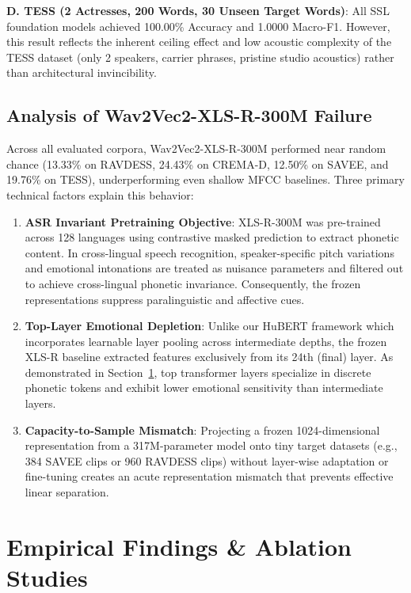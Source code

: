 \documentclass[10pt,journal,compsoc]{IEEEtran}
\begin{document}
\textbf{D. TESS (2 Actresses, 200 Words, 30 Unseen Target Words)}: All SSL foundation models achieved 100.00\% Accuracy and 1.0000 Macro-F1. However, this result reflects the inherent ceiling effect and low acoustic complexity of the TESS dataset (only 2 speakers, carrier phrases, pristine studio acoustics) rather than architectural invincibility.

\subsection{Analysis of Wav2Vec2-XLS-R-300M Failure}
Across all evaluated corpora, Wav2Vec2-XLS-R-300M performed near random chance (13.33\% on RAVDESS, 24.43\% on CREMA-D, 12.50\% on SAVEE, and 19.76\% on TESS), underperforming even shallow MFCC baselines. Three primary technical factors explain this behavior:
\begin{enumerate}
    \item \textbf{ASR Invariant Pretraining Objective}: XLS-R-300M was pre-trained across 128 languages using contrastive masked prediction to extract phonetic content. In cross-lingual speech recognition, speaker-specific pitch variations and emotional intonations are treated as nuisance parameters and filtered out to achieve cross-lingual phonetic invariance. Consequently, the frozen representations suppress paralinguistic and affective cues.
    \item \textbf{Top-Layer Emotional Depletion}: Unlike our HuBERT framework which incorporates learnable layer pooling across intermediate depths, the frozen XLS-R baseline extracted features exclusively from its 24th (final) layer. As demonstrated in Section~\ref{sec:ablation}, top transformer layers specialize in discrete phonetic tokens and exhibit lower emotional sensitivity than intermediate layers.
    \item \textbf{Capacity-to-Sample Mismatch}: Projecting a frozen 1024-dimensional representation from a 317M-parameter model onto tiny target datasets (e.g., 384 SAVEE clips or 960 RAVDESS clips) without layer-wise adaptation or fine-tuning creates an acute representation mismatch that prevents effective linear separation.
\end{enumerate}

\section{Empirical Findings \& Ablation Studies}
\label{sec:ablation}
\end{document}
